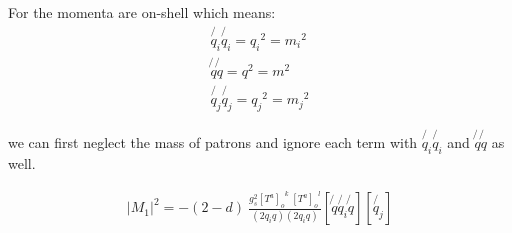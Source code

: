 For the momenta are on-shell which means:
\begin{equation}
\begin{split}
\not{q_i}\not{q_i} = {q_i}^2= {m_i}^2\\
\not{q}\not{q} = {q}^2= {m}^2\\
\not{q_j}\not{q_j} = {q_j}^2= {m_j}^2
\end{split}
\end{equation}

we can first neglect the mass of patrons and ignore each term with $ \not{q_i}\not{q_i} $ and  $ \not{q}\not{q} $ as well.

\begin{equation}
\begin{split}
|M_1|^2=-(2-d)\:\frac{g_s^2  {[T^a]_{o}}^k \: {[T^a]_o}^l }{(2q_i q)(2q_i q)}
[\not{q} \not{q_i} \not{q}]
[\not{q_j}]
\end{split}
\end{equation}

